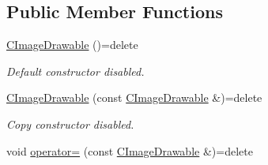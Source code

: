 \subsection*{Public Member Functions}
\begin{DoxyCompactItemize}
\item 
\hyperlink{class_c_image_drawable_a0af067ad80ece0bea046dded19c5b9d4}{C\+Image\+Drawable} ()=delete
\begin{DoxyCompactList}\small\item\em Default constructor disabled. \end{DoxyCompactList}\item 
\hypertarget{class_c_image_drawable_a2955356238c638373d39ed99c5422cf3}{\hyperlink{class_c_image_drawable_a2955356238c638373d39ed99c5422cf3}{C\+Image\+Drawable} (const \hyperlink{class_c_image_drawable}{C\+Image\+Drawable} \&)=delete}\label{class_c_image_drawable_a2955356238c638373d39ed99c5422cf3}

\begin{DoxyCompactList}\small\item\em Copy constructor disabled. \end{DoxyCompactList}\item 
\hypertarget{class_c_image_drawable_a717129f6ce9e9fa5d9a512a85a33a8b1}{void \hyperlink{class_c_image_drawable_a717129f6ce9e9fa5d9a512a85a33a8b1}{operator=} (const \hyperlink{class_c_image_drawable}{C\+Image\+Drawable} \&)=delete}\label{class_c_image_drawable_a717129f6ce9e9fa5d9a512a85a33a8b1}


\end{DoxyCompactItemize}
